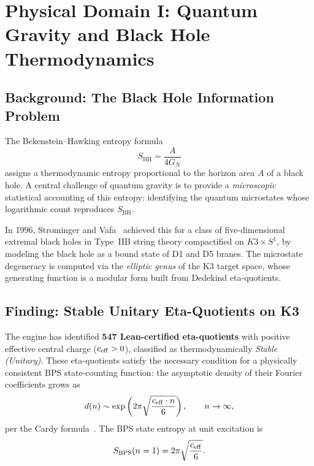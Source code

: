 \section{Physical Domain I: Quantum Gravity and Black Hole Thermodynamics}
\label{sec:quantum_gravity}

\subsection{Background: The Black Hole Information Problem}

The Bekenstein--Hawking entropy formula~\cite{bekenstein_1973,hawking_1975}
\begin{equation}
  S_{\mathrm{BH}} = \frac{A}{4G_N}
\end{equation}
assigns a thermodynamic entropy proportional to the horizon area $A$ of a black hole. A central challenge of quantum gravity is to provide a \emph{microscopic} statistical accounting of this entropy: identifying the quantum microstates whose logarithmic count reproduces $S_{\mathrm{BH}}$.

In 1996, Strominger and Vafa~\cite{strominger_vafa_1996} achieved this for a class of five-dimensional extremal black holes in Type~IIB string theory compactified on $K3 \times S^1$, by modeling the black hole as a bound state of D1 and D5 branes. The microstate degeneracy is computed via the \emph{elliptic genus} of the K3 target space, whose generating function is a modular form built from Dedekind eta-quotients.

\subsection{Finding: Stable Unitary Eta-Quotients on K3}

The \RAMA{} engine has identified \textbf{547 Lean-certified eta-quotients} with positive effective central charge ($c_{\mathrm{eff}} > 0$), classified as thermodynamically \emph{Stable (Unitary)}. These eta-quotients satisfy the necessary condition for a physically consistent BPS state-counting function: the asymptotic density of their Fourier coefficients grows as
\begin{equation}
  \label{eq:cardy_growth}
  d(n) \sim \exp\left(2\pi\sqrt{\frac{c_{\mathrm{eff}} \cdot n}{6}}\right), \qquad n \to \infty,
\end{equation}
per the Cardy formula~\cite{cardy_1986}. The BPS state entropy at unit excitation is
\begin{equation}
  S_{\mathrm{BPS}}(n=1) = 2\pi\sqrt{\frac{c_{\mathrm{eff}}}{6}}.
\end{equation}

